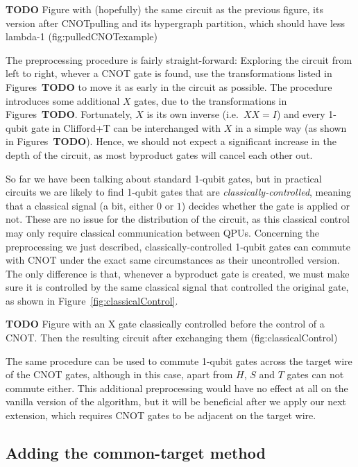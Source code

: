 \textbf{TODO} Figure with (hopefully) the same circuit as the previous figure, its version after CNOTpulling and its hypergraph partition, which should have less lambda-1 (fig:pulledCNOTexample)

The preprocessing procedure is fairly straight-forward: Exploring the circuit from left to right, whever a CNOT gate is found, use the transformations listed in Figures~\textbf{TODO} to move it as early in the circuit as possible. The procedure introduces some additional \(X\) gates, due to the transformations in Figures~\textbf{TODO}. Fortunately, \(X\) is its own inverse (i.e.\ \(XX = I\)) and every 1-qubit gate in Clifford+T can be interchanged with \(X\) in a simple way (as shown in Figures~\textbf{TODO}). Hence, we should not expect a significant increase in the depth of the circuit, as most byproduct gates will cancel each other out.

So far we have been talking about standard 1-qubit gates, but in practical circuits we are likely to find 1-qubit gates that are \textit{classically-controlled}, meaning that a classical signal (a bit, either \(0\) or \(1\)) decides whether the gate is applied or not. These are no issue for the distribution of the circuit, as this classical control may only require classical communication between QPUs. Concerning the preprocessing we just described, classically-controlled 1-qubit gates can commute with CNOT under the exact same circumstances as their uncontrolled version. The only difference is that, whenever a byproduct gate is created, we must make sure it is controlled by the same classical signal that controlled the original gate, as shown in Figure~\ref{fig:classicalControl}.

\textbf{TODO} Figure with an X gate classically controlled before the control of a CNOT. Then the resulting circuit after exchanging them (fig:classicalControl)

The same procedure can be used to commute 1-qubit gates across the target wire of the CNOT gates, although in this case, apart from \(H\), \(S\) and \(T\) gates can not commute either. This additional preprocessing would have no effect at all on the vanilla version of the algorithm, but it will be beneficial after we apply our next extension, which requires CNOT gates to be adjacent on the target wire.


\subsection{Adding the common-target method}
\label{BothEnds}

